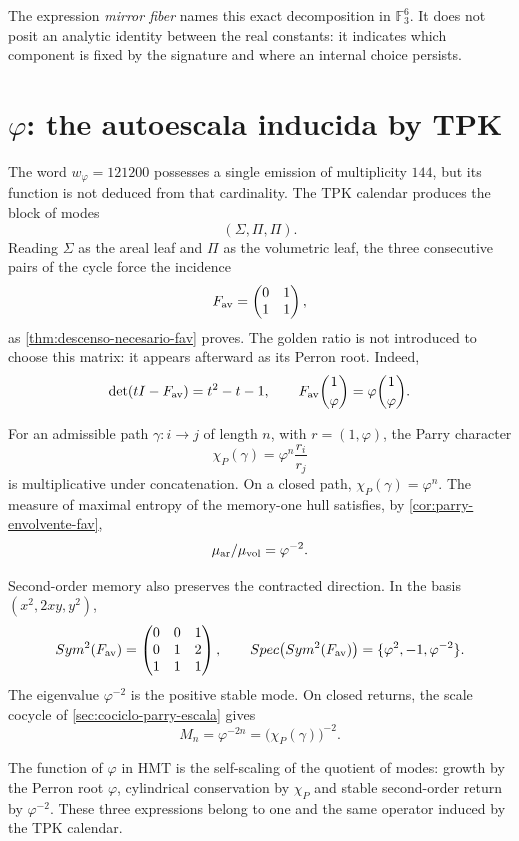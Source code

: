 \def\HMTAxialTheoremDefined{1}

The expression \emph{mirror fiber} names this exact decomposition in
\(\mathbb F_3^6\). It does not posit an analytic identity between the real
constants: it indicates which component is fixed by the signature and where an
internal choice persists.

\section{\texorpdfstring{\(\varphi\)}{Phi}: the autoescala inducida by TPK}

The word \(w_\varphi=121200\) possesses a single emission of multiplicity
\(144\), but its function is not deduced from that cardinality. The TPK calendar
produces the block of modes
\[
(\Sigma,\Pi,\Pi).
\]
Reading \(\Sigma\) as the areal leaf and \(\Pi\) as the volumetric leaf, the
three consecutive pairs of the cycle force the incidence
\[
F_{\rm av}
=
\begin{pmatrix}
0&1\\
1&1
\end{pmatrix},
\]
as \cref{thm:descenso-necesario-fav} proves. The golden ratio is not
introduced to choose this matrix: it appears afterward as its Perron root.
Indeed,
\[
\det(tI-F_{\rm av})=t^2-t-1,
\qquad
F_{\rm av}\binom{1}{\varphi}
=\varphi\binom{1}{\varphi}.
\]

For an admissible path \(\gamma:i\to j\) of length \(n\), with
\(r=(1,\varphi)\), the Parry character
\[
\chi_P(\gamma)=\varphi^n\frac{r_i}{r_j}
\]
is multiplicative under concatenation. On a closed path,
\(\chi_P(\gamma)=\varphi^n\). The measure of maximal entropy of the memory-one
hull satisfies, by \cref{cor:parry-envolvente-fav},
\[
\frac{\mu_{\rm ar}}{\mu_{\rm vol}}=\varphi^{-2}.
\]

Second-order memory also preserves the contracted direction. In the basis \((x^2,2xy,y^2)\),
\[
\operatorname{Sym}^2(F_{\rm av})
=
\begin{pmatrix}
0&0&1\\
0&1&2\\
1&1&1
\end{pmatrix},
\qquad
\operatorname{Spec}\bigl(\operatorname{Sym}^2(F_{\rm av})\bigr)
=\{\varphi^2,-1,\varphi^{-2}\}.
\]
The eigenvalue \(\varphi^{-2}\) is the positive stable mode. On closed
returns, the scale cocycle of \cref{sec:cociclo-parry-escala} gives
\[
M_n=\varphi^{-2n}={\bigl(\chi_P(\gamma)\bigr)}^{-2}.
\]

\begin{proposition}
\label{prop:autoescala-phi-rev6}
The function of \(\varphi\) in HMT is the self-scaling of the quotient of modes:
growth by the Perron root \(\varphi\), cylindrical conservation by
\(\chi_P\) and stable second-order return by \(\varphi^{-2}\).
These three expressions belong to one and the same operator induced by the
TPK calendar.
\end{proposition}

